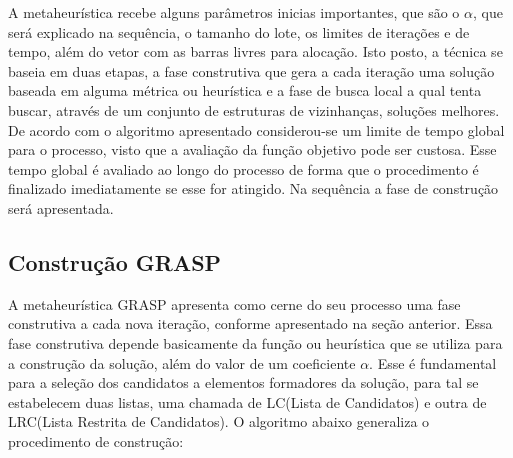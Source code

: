 \documentclass[12pt]{article}
\begin{document}
A metaheurística recebe alguns parâmetros inicias importantes, que são o $\alpha$, que será explicado na sequência, o tamanho do lote, os limites de iterações e de tempo, além do vetor com as barras livres para alocação. Isto posto, a técnica se baseia em duas etapas, a fase construtiva que gera a cada iteração uma solução baseada em alguma métrica ou heurística e a fase de busca local a qual tenta buscar, através de um conjunto de estruturas de vizinhanças, soluções melhores. De acordo com o algoritmo apresentado considerou-se um limite de tempo global para o processo, visto que a avaliação da função objetivo pode ser custosa. Esse tempo global é avaliado ao longo do processo de forma que o procedimento é finalizado imediatamente se esse for atingido. Na sequência a fase de construção será apresentada.

\subsection{Construção GRASP}

 A metaheurística GRASP apresenta como cerne do seu processo uma fase construtiva a cada nova iteração, conforme apresentado na seção anterior. Essa fase construtiva depende basicamente da função ou heurística que se utiliza para a construção da solução,  além do valor de um coeficiente $\alpha$. Esse é fundamental para a seleção dos candidatos a elementos formadores da solução, para tal se estabelecem duas listas, uma chamada de LC(Lista de Candidatos) e outra de LRC(Lista Restrita de Candidatos). O algoritmo abaixo generaliza o procedimento de construção:
 
\end{document}
